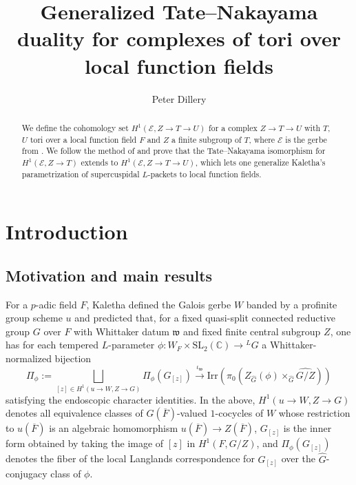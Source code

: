 \documentclass{amsart}
\title{Generalized Tate--Nakayama duality for complexes of tori over local function fields}
\author{Peter Dillery}
\theoremstyle{definition}
\theoremstyle{remark}
\newcommand{\ov}{\overline}
\begin{document}
\begin{abstract}
We define the cohomology set $H^{1}(\mathcal{E}, Z \to T \to U)$ for a complex $Z \to T \to U$ with $T$, $U$ tori over a local function field $F$ and $Z$ a finite subgroup of $T$, where $\mathcal{E}$ is the gerbe from \cite{Dillery1}. We follow the method of \cite{Kal26b} and prove that the Tate--Nakayama isomorphism \cite[Theorem 4.10]{Dillery1} for $H^{1}(\mathcal{E}, Z \to T)$ extends to $H^{1}(\mathcal{E}, Z \to T \to U)$, which lets one generalize Kaletha's parametrization \cite{Kal22} of supercuspidal $L$-packets to local function fields.
\end{abstract}

\maketitle

\section{Introduction}
\subsection{Motivation and main results}
For a $p$-adic field $F$, Kaletha defined \cite{kaletha16} the Galois gerbe $W$ banded by a profinite group scheme $u$ and predicted \cite[\S 5.4]{kaletha16} that, for a fixed quasi-split connected reductive group $G$ over $F$ with Whittaker datum $\mathfrak{w}$ and fixed finite central subgroup $Z$, one has for each tempered $L$-parameter $\phi \colon W_{F} \times \mathrm{SL}_{2}(\mathbb{C}) \to {^{L}G}$ a Whittaker-normalized bijection
\begin{equation}\label{eq:rigLLC}
    \Pi_{\phi}:=\bigsqcup_{[z] \in H^{1}(u \to W, Z \to G)} \Pi_{\phi}(G_{[z]}) \xrightarrow{\iota_{\mathfrak{w}}} \text{Irr}(\pi_{0}(Z_{\widehat{G}}(\phi) \times_{\widehat{G}} \widehat{G/Z}))
\end{equation}
satisfying the endoscopic character identities. In the above, $H^{1}(u \to W, Z \to G)$ denotes all equivalence classes of $G(\ov{F})$-valued $1$-cocycles of $W$ whose restriction to $u(\ov{F})$ is an algebraic homomorphism $u(\ov{F}) \to Z(\ov{F})$, $G_{[z]}$ is the inner form obtained by taking the image of $[z]$ in $H^{1}(F,G/Z)$, and $\Pi_{\phi}(G_{[z]})$ denotes the fiber of the local Langlands correspondence for $G_{[z]}$ over the $\widehat{G}$-conjugacy class of $\phi$.
\end{document}
